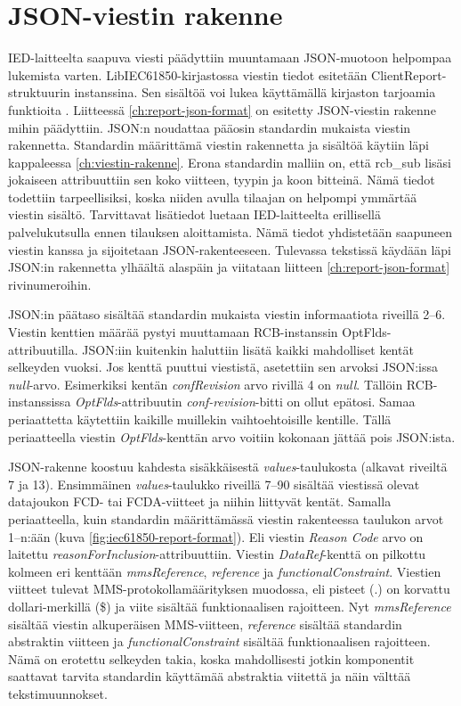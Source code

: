 \section{JSON-viestin rakenne}
IED-laitteelta saapuva viesti päädyttiin muuntamaan JSON-muotoon helpompaa lukemista varten. LibIEC61850-kirjastossa viestin tiedot esitetään ClientReport-struk\-tuu\-rin instanssina. Sen sisältöä voi lukea käyttämällä kirjaston tarjoamia funktioita \cite{libIEC61850-doc}.  Liitteessä \ref{ch:report-json-format} on esitetty JSON-viestin rakenne mihin päädyttiin. JSON:n noudattaa pääosin standardin mukaista viestin rakennetta. Standardin määrittämä viestin rakennetta ja sisältöä käytiin läpi kappaleessa \ref{ch:viestin-rakenne}. Erona standardin malliin on, että rcb\_sub lisäsi jokaiseen attribuuttiin sen koko viitteen, tyypin ja koon bitteinä. Nämä tiedot todettiin tarpeellisiksi, koska niiden avulla tilaajan on helpompi ymmärtää viestin sisältö. Tarvittavat lisätiedot luetaan IED-laitteelta erillisellä palvelukutsulla ennen tilauksen aloittamista. Nämä tiedot yhdistetään saapuneen viestin kanssa ja sijoitetaan JSON-rakenteeseen. Tulevassa tekstissä käydään läpi JSON:in rakennetta ylhäältä alaspäin ja viitataan liitteen \ref{ch:report-json-format} rivinumeroihin.

JSON:in päätaso sisältää standardin mukaista viestin informaatiota riveillä 2--6. Viestin kenttien määrää pystyi muuttamaan RCB-instanssin OptFlds-attribuutilla. JSON:iin kuitenkin haluttiin lisätä kaikki mahdolliset kentät selkeyden vuoksi. Jos kenttä puuttui viestistä, asetettiin sen arvoksi JSON:issa \emph{null}-arvo. Esimerkiksi kentän \emph{confRevision} arvo rivillä 4 on \emph{null}. Tällöin RCB-instanssissa \emph{OptFlds}-attribuutin \emph{conf-revision}-bitti on ollut epätosi. Samaa periaattetta käytettiin kaikille muillekin vaihtoehtoisille kentille. Tällä periaatteella viestin \emph{OptFlds}-kenttän arvo voitiin kokonaan jättää pois JSON:ista.

JSON-rakenne koostuu kahdesta sisäkkäisestä \emph{values}-taulukosta (alkavat riveiltä 7 ja 13). Ensimmäinen \emph{values}-taulukko riveillä 7--90 sisältää viestissä olevat datajoukon FCD- tai FCDA-viitteet ja niihin liittyvät kentät. Samalla periaatteella, kuin standardin määrittämässä viestin rakenteessa taulukon arvot 1--n:ään (kuva \ref{fig:iec61850-report-format}). Eli viestin \emph{Reason Code} arvo on laitettu \emph{reasonForInclusion}-attribuuttiin. Viestin \emph{DataRef}-kenttä on pilkottu kolmeen eri kenttään \emph{mmsReference}, \emph{reference} ja \emph{functionalConstraint}. Viestien viitteet tulevat MMS-protokollamäärityksen muodossa, eli pisteet (.) on korvattu dollari-merkillä (\$) ja viite sisältää funktionaalisen rajoitteen. Nyt \emph{mmsReference} sisältää viestin alkuperäisen MMS-viitteen, \emph{reference} sisältää standardin abstraktin viitteen ja \emph{functionalConstraint} sisältää funktionaalisen rajoitteen. Nämä on erotettu selkeyden takia, koska mahdollisesti jotkin komponentit saattavat tarvita standardin käyttämää abstraktia viitettä ja näin välttää tekstimuunnokset.

